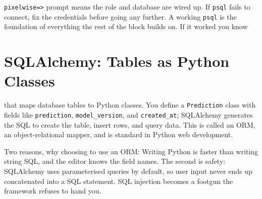 


\texttt{pixelwise=>} prompt means the role and database are wired up.
If \texttt{psql} fails to connect, fix the credentials before going any
further.
A working \texttt{psql} is the foundation of everything the rest of the
block builds on. If it worked you know








\newpage
\section{SQLAlchemy: Tables as Python Classes}

 that maps database tables to
Python classes. You define a \texttt{Prediction} class with fields like
\texttt{prediction}, \texttt{model\_version}, and \texttt{created\_at};
SQLAlchemy generates the SQL to create the table, insert rows, and query
data. This is called an ORM, an object-relational mapper, and
is standard in Python web development.




Two reasons, why choosing to use an ORM: Writing Python is faster than writing
string SQL, and the editor knows the field names. The second is safety:
SQLAlchemy uses parameterised queries by default, so user input never ends
up concatenated into a SQL statement. SQL injection becomes a footgun the
framework refuses to hand you.

